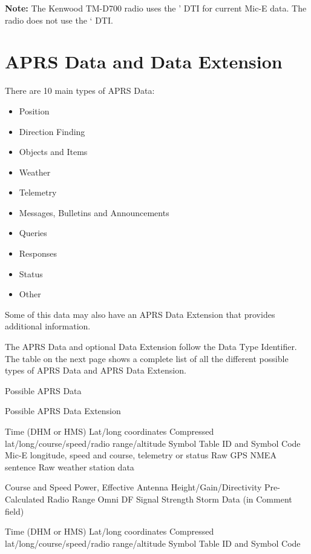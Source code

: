 
\textbf{Note:} The Kenwood TM-D700 radio uses the ' DTI for current Mic-E data.
The radio does not use the ‘ DTI.

\clearpage

\section{APRS Data and Data Extension}



There are 10 main types of APRS Data:

\begin {itemize}

\item Position
\item Direction Finding
\item Objects and Items
\item Weather
\item Telemetry
\item Messages, Bulletins and Announcements
\item Queries
\item Responses
\item Status
\item Other

\end{itemize}

Some of this data may also have an APRS Data Extension that provides
additional information.

The APRS Data and optional Data Extension follow the Data Type Identifier.
The table on the next page shows a complete list of all the different possible
types of APRS Data and APRS Data Extension.



Possible APRS Data

Possible APRS Data Extension

Time (DHM or HMS)
Lat/long coordinates
Compressed lat/long/course/speed/radio range/altitude
Symbol Table ID and Symbol Code
Mic-E longitude, speed and course, telemetry or status
Raw GPS NMEA sentence
Raw weather station data

Course and Speed
Power, Effective Antenna Height/Gain/Directivity
Pre-Calculated Radio Range
Omni DF Signal Strength
Storm Data (in Comment field)

Time (DHM or HMS)
Lat/long coordinates
Compressed lat/long/course/speed/radio range/altitude
Symbol Table ID and Symbol Code

